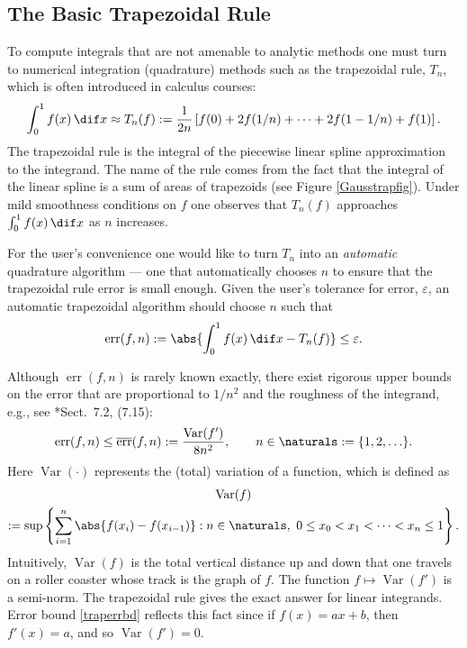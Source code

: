 \documentclass[]{article}
\DeclareMathOperator{\Var}{Var}
\DeclareMathOperator{\err}{err}
\newcommand{\oerr}{\overline{\err}}
\theoremstyle{definition}
\theoremstyle{remark}
\begin{document}
\subsection{The Basic Trapezoidal Rule}
To compute integrals that are not amenable to analytic methods one must turn to numerical integration (quadrature) methods such as the trapezoidal rule, $T_n$, which is often introduced in calculus courses:
\begin{equation}
\int_0^1 f(x) \, \dif x \approx T_n(f) := \frac{1}{2n} \left [ f(0) + 2 f(1/n) + \cdots + 2 f(1-1/n) + f(1) \right].
\end{equation}
The trapezoidal rule is the integral of the piecewise linear spline approximation to the integrand.  The name of the rule comes from the fact that the integral of the linear spline is a sum of areas of trapezoids (see Figure \ref{Gausstrapfig}). Under mild smoothness conditions on $f$ one observes that $T_n(f)$ approaches $\int_0^1 f(x) \, \dif x$ as $n$ increases. 

For the user's convenience one would like to turn $T_n$ into an \emph{automatic} quadrature algorithm --- one that automatically chooses $n$ to ensure that the trapezoidal rule error is small enough.  Given the user's tolerance for error, $\varepsilon$, an automatic trapezoidal algorithm should choose $n$ such that 
\begin{equation} \label{errdef}
\err(f,n) := \abs{\int_0^1 f(x) \, \dif x - T_n(f)} \le \varepsilon.
\end{equation}

Although $\err(f,n)$ is rarely known exactly, there exist rigorous upper bounds on the error that are proportional to $1/n^2$ and the roughness of the integrand, e.g., see *{Sect.\ 7.2, (7.15)}: 
\begin{equation} \label{traperrbd}
\err(f,n) \le \oerr(f,n):=\frac{\Var(f')}{8n^2}, \qquad n \in \naturals := \{1, 2, \ldots \}. 
\end{equation}
Here $\Var(\cdot)$ represents the (total) variation of a function, which is defined as
\begin{multline} \label{vardef}
\Var(f) \\
:= \sup \left \{ \sum_{i=1}^n \abs{f(x_i)-f(x_{i-1})} : n \in \naturals, \ 0 \le x_0 < x_1 < \cdots < x_{n} \le 1 \right\}.
\end{multline}
Intuitively, $\Var(f)$ is the total vertical distance up and down that one travels on a roller coaster whose track is the graph of $f$. The function $f \mapsto \Var(f')$ is a semi-norm. The trapezoidal rule gives the exact answer for linear integrands.  Error bound \eqref{traperrbd} reflects this fact since if $f(x)=ax+b$, then $f'(x)=a$, and so $\Var(f')=0$.
\end{document}
